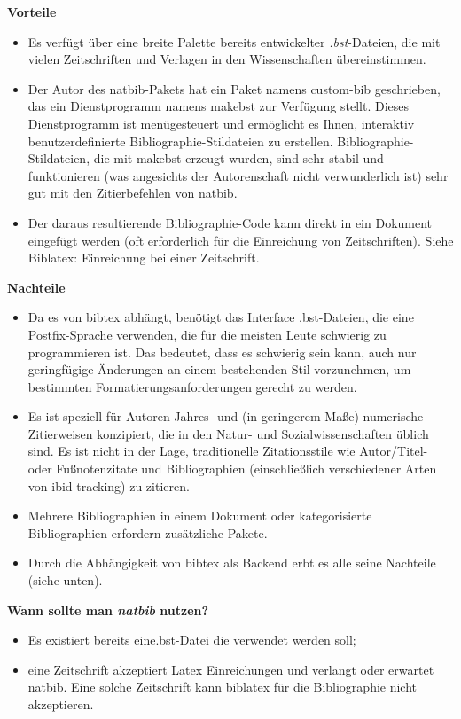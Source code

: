 \textbf{Vorteile}

\begin{itemize}
	\item Es verfügt über eine breite Palette bereits entwickelter \emph{.bst}-Dateien, die mit vielen Zeitschriften und Verlagen in den Wissenschaften übereinstimmen.
	\item Der Autor des natbib-Pakets hat ein Paket namens custom-bib geschrieben, das ein Dienstprogramm namens makebst zur Verfügung stellt. Dieses Dienstprogramm ist menügesteuert und ermöglicht es Ihnen, interaktiv benutzerdefinierte Bibliographie-Stildateien zu erstellen. Bibliographie-Stildateien, die mit makebst erzeugt wurden, sind sehr stabil und funktionieren (was angesichts der Autorenschaft nicht verwunderlich ist) sehr gut mit den Zitierbefehlen von natbib.
	\item Der daraus resultierende Bibliographie-Code kann direkt in ein Dokument eingefügt werden (oft erforderlich für die Einreichung von Zeitschriften). Siehe Biblatex: Einreichung bei einer Zeitschrift.
\end{itemize}

\textbf{Nachteile}

\begin{itemize}
	\item Da es von bibtex abhängt, benötigt das Interface .bst-Dateien, die eine Postfix-Sprache verwenden, die für die meisten Leute schwierig zu programmieren ist. Das bedeutet, dass es schwierig sein kann, auch nur geringfügige Änderungen an einem bestehenden Stil vorzunehmen, um bestimmten Formatierungsanforderungen gerecht zu werden.
	\item Es ist speziell für Autoren-Jahres- und (in geringerem Maße) numerische Zitierweisen konzipiert, die in den Natur- und Sozialwissenschaften üblich sind. Es ist nicht in der Lage, traditionelle Zitationsstile wie Autor/Titel- oder Fußnotenzitate und Bibliographien (einschließlich verschiedener Arten von ibid tracking) zu zitieren.
	\item Mehrere Bibliographien in einem Dokument oder kategorisierte Bibliographien erfordern zusätzliche Pakete.
	\item Durch die Abhängigkeit von bibtex als Backend erbt es alle seine Nachteile (siehe unten).
\end{itemize}

\textbf{Wann sollte man \emph{natbib} nutzen?}

\begin{itemize}
	\item Es existiert bereits eine.bst-Datei die verwendet werden soll;
	\item eine Zeitschrift akzeptiert Latex Einreichungen und verlangt oder erwartet natbib. Eine solche Zeitschrift kann biblatex für die Bibliographie nicht akzeptieren.
\end{itemize}

